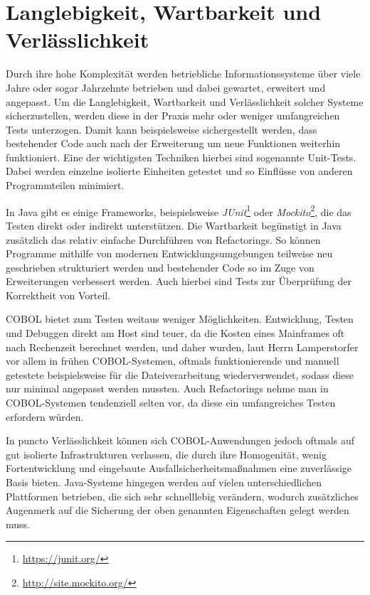 \section{Langlebigkeit, Wartbarkeit und Verlässlichkeit} \label{verlaesslichkeit}

Durch ihre hohe Komplexität werden betriebliche Informationssysteme \idR über viele Jahre oder sogar Jahrzehnte betrieben und dabei gewartet, erweitert und angepasst. Um die Langlebigkeit, Wartbarkeit und Verlässlichkeit solcher Systeme sicherzustellen, werden diese in der Praxis mehr oder weniger umfangreichen Tests unterzogen. Damit kann beispielsweise sichergestellt werden, dass bestehender Code auch nach der Erweiterung um neue Funktionen weiterhin funktioniert. Eine der wichtigsten Techniken hierbei sind sogenannte Unit-Tests. Dabei werden einzelne isolierte Einheiten getestet und so Einflüsse von anderen Programmteilen minimiert. 

In Java gibt es einige Frameworks, beispielsweise \textit{JUnit}\footnote{\url{https://junit.org/} \visitedOn} oder \textit{Mockito}\footnote{\url{http://site.mockito.org/} \visitedOn}, die das Testen direkt oder indirekt unterstützen. Die Wartbarkeit begünstigt in Java zusätzlich das relativ einfache Durchführen von Refactorings. So können Programme mithilfe von modernen Entwicklungsumgebungen teilweise neu geschrieben \bzw strukturiert werden und bestehender Code so im Zuge von Erweiterungen verbessert werden. Auch hierbei sind Tests zur Überprüfung der Korrektheit von Vorteil. 

COBOL bietet zum Testen weitaus weniger Möglichkeiten. Entwicklung, Testen und Debuggen direkt am Host sind teuer, da die Kosten eines Mainframes oft nach Rechenzeit berechnet werden, und daher wurden, laut Herrn Lamperstorfer vor allem in frühen COBOL-Systemen, oftmals funktionierende und manuell getestete  beispielsweise für die Dateiverarbeitung wiederverwendet, sodass diese nur minimal angepasst werden mussten. Auch Refactorings nehme man in COBOL-Systemen tendenziell selten vor, da diese ein umfangreiches Testen erfordern würden.

In puncto Verlässlichkeit können sich COBOL-Anwendungen jedoch oftmals auf gut isolierte Infrastrukturen verlassen, die durch ihre Homogenität, wenig Fortentwicklung und eingebaute Ausfallsicherheitsmaßnahmen eine zuverlässige Basis bieten. Java-Systeme hingegen werden auf vielen unterschiedlichen Plattformen betrieben, die sich sehr schnelllebig verändern, wodurch zusätzliches Augenmerk auf die Sicherung der oben genannten Eigenschaften gelegt werden muss.